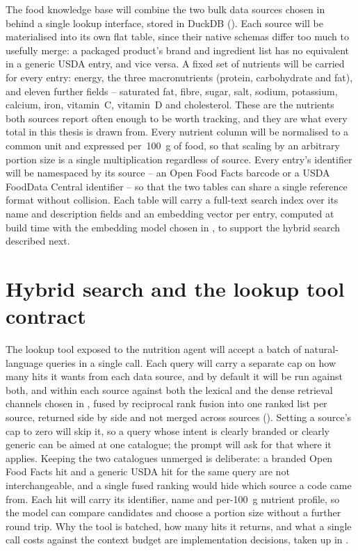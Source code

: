 The food knowledge base will combine the two bulk data sources chosen in  behind a single lookup interface, stored in DuckDB (). Each source will be materialised into its own flat table, since their native schemas differ too much to usefully merge: a packaged product's brand and ingredient list has no equivalent in a generic USDA entry, and vice versa. A fixed set of nutrients will be carried for every entry: energy, the three macronutrients (protein, carbohydrate and fat), and eleven further fields -- saturated fat, fibre, sugar, salt, sodium, potassium, calcium, iron, vitamin~C, vitamin~D and cholesterol. These are the nutrients both sources report often enough to be worth tracking, and they are what every total in this thesis is drawn from. Every nutrient column will be normalised to a common unit and expressed per~\qty{100}{\gram} of food, so that scaling by an arbitrary portion size is a single multiplication regardless of source. Every entry's identifier will be namespaced by its source -- an Open Food Facts barcode or a USDA FoodData Central identifier -- so that the two tables can share a single reference format without collision. Each table will carry a full-text search index over its name and description fields and an embedding vector per entry, computed at build time with the embedding model chosen in , to support the hybrid search described next.

\section{Hybrid search and the lookup tool contract}
\label{sec:design-hybrid-search}

The lookup tool exposed to the nutrition agent will accept a batch of natural-language queries in a single call. Each query will carry a separate cap on how many hits it wants from each data source, and by default it will be run against both, and within each source against both the lexical and the dense retrieval channels chosen in , fused by reciprocal rank fusion into one ranked list per source, returned side by side and not merged across sources (). Setting a source's cap to zero will skip it, so a query whose intent is clearly branded or clearly generic can be aimed at one catalogue; the prompt will ask for that where it applies. Keeping the two catalogues unmerged is deliberate: a branded Open Food Facts hit and a generic USDA hit for the same query are not interchangeable, and a single fused ranking would hide which source a code came from. Each hit will carry its identifier, name and per-\qty{100}{\gram} nutrient profile, so the model can compare candidates and choose a portion size without a further round trip. Why the tool is batched, how many hits it returns, and what a single call costs against the context budget are implementation decisions, taken up in .

